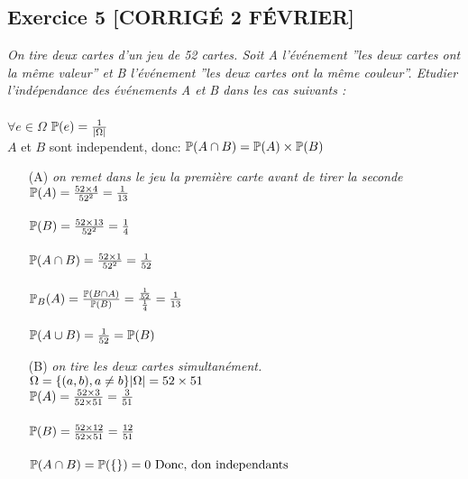 \subsection*{Exercice 5 [CORRIGÉ 2 FÉVRIER]}
\textit{On tire deux cartes d’un jeu de 52 cartes. Soit A l’événement ”les deux cartes ont la même valeur” et B l’événement ”les deux cartes ont la même couleur”. Etudier l’indépendance des événements A et B dans les cas suivants :}
\\
    \\
        $\forall{e} \in \Omega$   $\mathbb{P}(e) = \frac{1}{|\Omega|}$
    \\
    $A$ et $B$ sont independent, donc: $ \mathbb{P}(A \cap B) = \mathbb{P}(A) \times \mathbb{P}(B)$
\begin{itemize}
    \item[(A)]  \textit{on remet dans le jeu la première carte avant de tirer la seconde}
    \\
    $\mathbb{P}(A) = \frac{52 \times 4}{52^2} = \frac{1}{13}$
    \\
    \\
    $\mathbb{P}(B) = \frac{52 \times 13}{52^2} = \frac{1}{4}$
    \\
    \\
    $\mathbb{P}(A \cap B) = \frac{52 \times 1}{52^2} = \frac{1}{52}$
     \\
    \\
    $\mathbb{P}_B(A) = \frac{\mathbb{P}(B \cap A)}{\mathbb{P}(B)} = \frac{\frac{1}{52}}{\frac{1}{4}} = \frac{1}{13}$
    \\
    \\
    $\mathbb{P}(A \cup B) = \frac{1}{52} = \mathbb{P}(B)$
    
    \item[(B)]  \textit{on tire les deux cartes simultanément.}
    \\
    $\Omega = \{(a,b), a \neq b\} \\
    |\Omega| = 52 \times 51 $
    \\
    $\mathbb{P}(A) = \frac{52 \times 3}{52 \times 51} = \frac{3}{51}$
    \\
    \\
    $\mathbb{P}(B) = \frac{52 \times 12}{52 \times 51} = \frac{12}{51}$
    \\
    \\
    $\mathbb{P}(A \cap B) = \mathbb{P}(\{\}) = 0 \text{   Donc, don independants}$
    

\end{itemize}